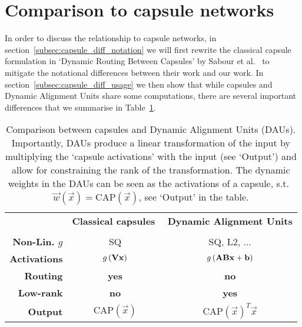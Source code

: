 \section{Comparison to capsule networks}
\label{sec:capsule_comparison}
In order to discuss the relationship to capsule networks, in section~\ref{subsec:capsule_diff_notation} we will first rewrite the classical capsule formulation in
    `Dynamic Routing Between Capsules' by Sabour et al.~ 
    to mitigate the notational differences between their work and our work.
In section~\ref{subsec:capsule_diff_usage} we then show that while capsules and Dynamic Alignment Units share some computations, there are several important differences that we summarise in Table~\ref{tbl:caps}.
\begin{table}[th]
    \vspace{.5em}
    \centering
    \begin{tabular}{r | c c}
        &\small\textbf{Classical capsules$\,\,$} &
        \small\textbf{Dynamic Alignment Units} \\\cline{1-3}&&\\[-.1em]
         \small\textbf{Non-Lin. $g$} &
         \small
         SQ&
         \small
         SQ, L2, ...\\[.5em]
         \small\textbf{Activations} &
         \small
         $ g\left(\mat v \vec x\right)$&
         \small$
         g\left(\mat{AB}\vec x+ \vec b\right)$\\[.5em]
         \small\textbf{Routing} &
         \small\textbf{yes} &
         \small\textbf{no}\\[.5em]
         \small\textbf{Low-rank} &
         \small\textbf{no} &
         \small\textbf{yes}\\[.5em]
         \small\textbf{Output} &
         $\text{CAP}(\vec x)$ &
         $\text{CAP}(\vec x)^T\vec x$
    \end{tabular}
    \caption{Comparison between capsules and Dynamic Alignment Units (DAUs). Importantly, DAUs produce a linear transformation of the input by multiplying the `capsule activations' with the input (see `Output') and allow for constraining the rank of the transformation. The dynamic weights in the DAUs can be seen as the activations of a capsule, s.t.~$\vec w(\vec x)=\text{CAP}(\vec x)$, see `Output' in the table.}
    \label{tbl:caps}
    \vspace{-.5em}
\end{table}
